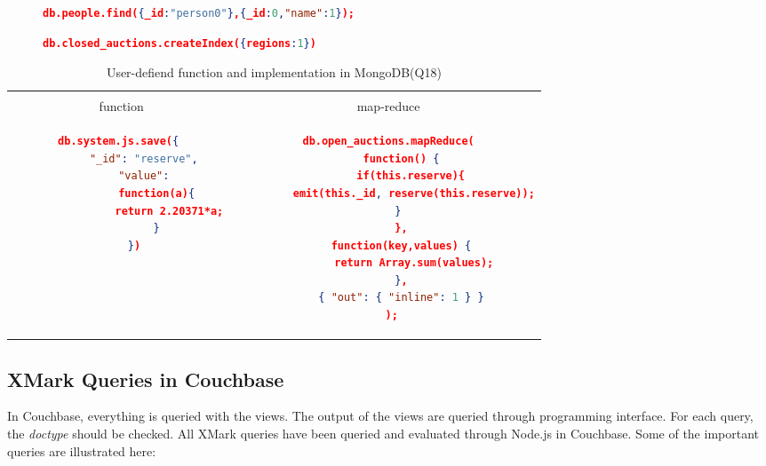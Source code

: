 \begin{figure}
\centering
\begin{lstlisting}[language=JSON, caption=XMark Query Q1 in MongoDB, label=mongo-xmark-q1]
		db.people.find({_id:"person0"},{_id:0,"name":1});
\end{lstlisting}

\centering
\begin{lstlisting}[language=JSON, caption=MongoDB secondary Index, label=mongodb-create-index]
             db.closed_auctions.createIndex({regions:1})
\end{lstlisting}
\end{figure}



\begin{longtable}{c|c}
    \hline
	\caption{ User-defiend function and implementation in MongoDB(Q18)}
	\label{tbl:mongodb-q18}\\
    {function } & {map-reduce}\\
	\hline
\begin{minipage}{.4\textwidth}
\begin{lstlisting}[language=JSON,basicstyle =\scriptsize]
    db.system.js.save({ 
        "_id": "reserve", 
        "value": 
            function(a){ 
                return 2.20371*a; 
            } 
    })
\end{lstlisting}
\end{minipage} &
\begin{minipage}{.4\textwidth}
\begin{lstlisting}[language=JSON,basicstyle =\scriptsize]
db.open_auctions.mapReduce(
    function() {
       if(this.reserve){
        emit(this._id, reserve(this.reserve));
       }    
    },
    function(key,values) {
        return Array.sum(values);
    },
    { "out": { "inline": 1 } }
 );
\end{lstlisting}
\end{minipage}
\end{longtable}


\subsection{XMark Queries in Couchbase}
 In Couchbase, everything is queried with the views. The output of the views are queried through programming interface. For each query, the \textit{doctype} should be checked.  All XMark queries have been queried and evaluated through Node.js in Couchbase. Some of the important queries are illustrated here:
 
